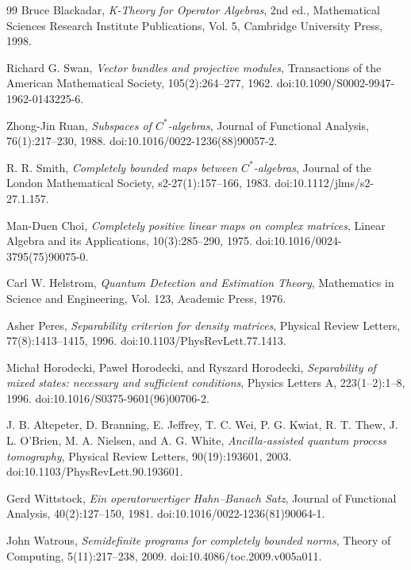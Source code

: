 \documentclass{article}
\begin{document}
\begin{thebibliography}{99}
Bruce Blackadar,
\textit{K-Theory for Operator Algebras},
2nd ed., Mathematical Sciences Research Institute Publications, Vol. 5,
Cambridge University Press, 1998.

Richard G. Swan,
\textit{Vector bundles and projective modules},
Transactions of the American Mathematical Society, 105(2):264--277, 1962.
doi:10.1090/S0002-9947-1962-0143225-6.

Zhong-Jin Ruan,
\textit{Subspaces of $C^*$-algebras},
Journal of Functional Analysis, 76(1):217--230, 1988.
doi:10.1016/0022-1236(88)90057-2.

R. R. Smith,
\textit{Completely bounded maps between $C^*$-algebras},
Journal of the London Mathematical Society, s2-27(1):157--166, 1983.
doi:10.1112/jlms/s2-27.1.157.

Man-Duen Choi,
\textit{Completely positive linear maps on complex matrices},
Linear Algebra and its Applications, 10(3):285--290, 1975.
doi:10.1016/0024-3795(75)90075-0.

Carl W. Helstrom,
\textit{Quantum Detection and Estimation Theory},
Mathematics in Science and Engineering, Vol. 123,
Academic Press, 1976.

Asher Peres,
\textit{Separability criterion for density matrices},
Physical Review Letters, 77(8):1413--1415, 1996.
doi:10.1103/PhysRevLett.77.1413.

Micha{\l} Horodecki, Pawe{\l} Horodecki, and Ryszard Horodecki,
\textit{Separability of mixed states: necessary and sufficient conditions},
Physics Letters A, 223(1--2):1--8, 1996.
doi:10.1016/S0375-9601(96)00706-2.

J. B. Altepeter, D. Branning, E. Jeffrey, T. C. Wei, P. G. Kwiat,
R. T. Thew, J. L. O'Brien, M. A. Nielsen, and A. G. White,
\textit{Ancilla-assisted quantum process tomography},
Physical Review Letters, 90(19):193601, 2003.
doi:10.1103/PhysRevLett.90.193601.

Gerd Wittstock,
\textit{Ein operatorwertiger Hahn--Banach Satz},
Journal of Functional Analysis, 40(2):127--150, 1981.
doi:10.1016/0022-1236(81)90064-1.

John Watrous,
\textit{Semidefinite programs for completely bounded norms},
Theory of Computing, 5(11):217--238, 2009.
doi:10.4086/toc.2009.v005a011.


\end{thebibliography}
\end{document}
